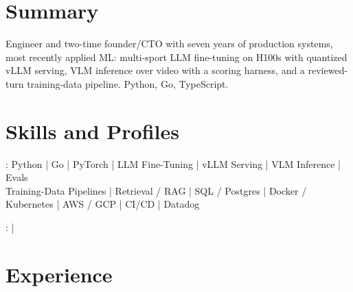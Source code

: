 \documentclass[print]{jack-resume}
\begin{document}
\pagecolor{darkmodeBackground}


\begin{minipage}[t][1cm][t]{.03\textwidth}
    \hfill
\end{minipage}

\section{Summary}
Engineer and two-time founder/CTO with seven years of production systems, most recently applied ML: multi-sport LLM fine-tuning on H100s with quantized vLLM serving, VLM inference over video with a scoring harness, and a reviewed-turn training-data pipeline. Python, Go, TypeScript.
\sectionsep

\section{Skills and Profiles}
:
Python \hfill | \hfill
Go \hfill | \hfill
PyTorch \hfill | \hfill
LLM Fine-Tuning \hfill | \hfill
vLLM Serving \hfill | \hfill
VLM Inference \hfill | \hfill
Evals \\
\hspace{1.0cm} Training-Data Pipelines \hfill | \hfill
Retrieval / RAG \hfill | \hfill
SQL / Postgres \hfill | \hfill
Docker / Kubernetes \hfill | \hfill
AWS / GCP \hfill | \hfill
CI/CD \hfill | \hfill
Datadog \\

\raggedright{
    :
      \href{https://www.linkedin.com/in/jack-sturtevant/}{ \ExternalLink} |
     \href{https://github.com/jacksturt}{ \ExternalLink}}

\section{Experience}
\end{document}
